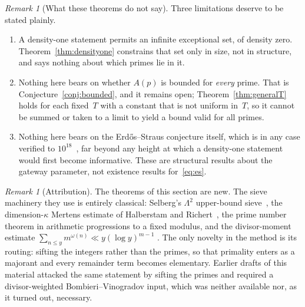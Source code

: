 \documentclass[12pt]{amsart}
\theoremstyle{definition}
\theoremstyle{remark}
\newtheorem{remark}[theorem]{Remark}
\begin{document}
\begin{remark}[What these theorems do not say]\label{rem:density-limits}
Three limitations deserve to be stated plainly.
\begin{enumerate}[label=\textup{(\alph*)}]
  \item A density-one statement permits an infinite exceptional set, of
    density zero.  Theorem~\ref{thm:densityone} constrains that set only
    in size, not in structure, and says nothing about which primes lie
    in it.
  \item Nothing here bears on whether $A(p)$ is bounded for
    \emph{every} prime.  That is Conjecture~\ref{conj:bounded}, and it
    remains open; Theorem~\ref{thm:generalT} holds for each fixed~$T$
    with a constant that is not uniform in~$T$, so it cannot be
    summed or taken to a limit to yield a bound valid for all primes.
  \item Nothing here bears on the Erd\H{o}s--Straus conjecture itself,
    which is in any case verified to $10^{18}$~\cite{MihneaBogdan2025},
    far beyond any height at which a density-one statement would first
    become informative.  These are structural results about the gateway
    parameter, not existence results for~\eqref{eq:es}.
\end{enumerate}
\end{remark}

\begin{remark}[Attribution]\label{rem:density-attribution}
The theorems of this section are new.  The sieve machinery they use is
entirely classical: Selberg's $\Lambda^2$ upper-bound
sieve~\cite{Selberg1947}, the dimension-$\kappa$ Mertens estimate of
Halberstam and Richert~\cite[Lemma~5.3]{HalberstamRichert1974},
the prime number theorem in arithmetic progressions to a fixed modulus,
and the divisor-moment estimate
$\sum_{n \leq y} m^{\omega(n)} \ll y(\log y)^{m-1}$
\cite[Ch.~I.3, I.5]{Tenenbaum2015}.  The only novelty in the method is
its routing: sifting the integers rather than the primes, so that
primality enters as a majorant and every remainder term becomes
elementary.  Earlier drafts of this material attacked the same
statement by sifting the primes and required a divisor-weighted
Bombieri--Vinogradov input, which was neither available nor, as it
turned out, necessary.
\end{remark}
\end{document}
